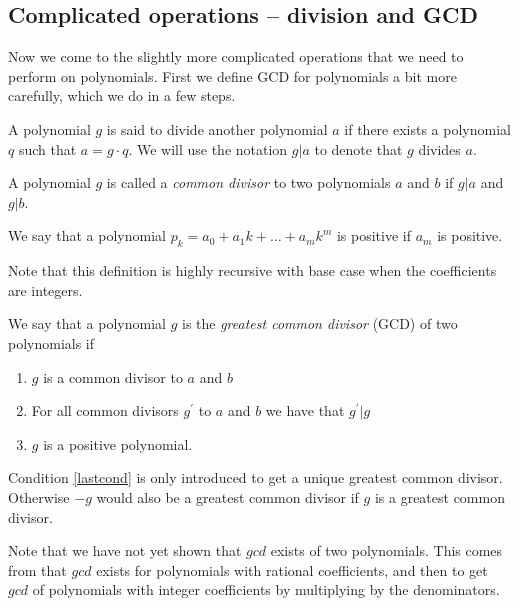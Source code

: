 \subsection{Complicated operations -- division and GCD}\label{Ch: div,mod,gcd}\label{Sub: diffop}
Now we come to the slightly more complicated operations that we need to perform on polynomials. First we define GCD for polynomials a bit more carefully, which we do in a few steps.
\begin{definition}\label{Def: divide}
  A polynomial $g$ is said to divide another polynomial $a$ if there exists a polynomial $q$ such that $a=g\cdot q$. We will use the notation $g|a$ to denote that $g$ divides $a$.
\end{definition}
\begin{definition}\label{Def: common divisor}
  A polynomial $g$ is called a \textit{common divisor} to two polynomials $a$ and $b$ if $g|a$ and $g|b$.
\end{definition}
\begin{definition}
  We say that a polynomial $p_k=a_0+a_1k+\ldots+a_mk^m$ is positive if $a_m$ is positive.
\end{definition}
\begin{remark}
  Note that this definition is highly recursive with base case when the coefficients are integers.
\end{remark}
\begin{definition}\label{Def: greatest common divisor}
  We say that a polynomial $g$ is the \textit{greatest common divisor} (GCD) of two polynomials if
  \begin{enumerate}
    \item $g$ is a common divisor to $a$ and $b$
    \item For all common divisors $g^\prime$ to $a$ and $b$ we have that $g^\prime|g$
    \item $g$ is a positive polynomial. \label{lastcond}
  \end{enumerate}
\end{definition}
\begin{remark}
  Condition \ref{lastcond} is only introduced to get a unique greatest common divisor. Otherwise $-g$ would also be a greatest common divisor if $g$ is a greatest common divisor.
\end{remark}
\begin{remark}
  Note that we have not yet shown that $gcd$ exists of two polynomials. This comes from that $gcd$ exists for polynomials with rational coefficients, and then to get $gcd$ of polynomials with integer coefficients by multiplying by the denominators.
\end{remark}

